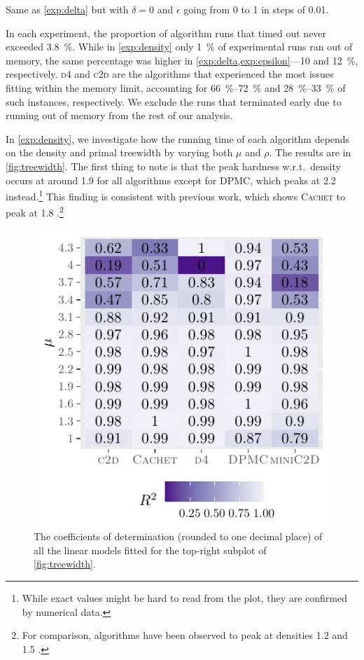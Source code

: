\begin{experiment}[$\epsilon$]\label{exp:epsilon}
  Same as \cref{exp:delta} but with $\delta = 0$ and $\epsilon$ going from 0 to
  1 in steps of 0.01.
\end{experiment}

In each experiment, the proportion of algorithm runs that timed out never
exceeded \SI{3.8}{\percent}. While in \cref{exp:density} only \SI{1}{\percent}
of experimental runs ran out of memory, the same percentage was higher in
\cref{exp:delta,exp:epsilon}---10 and \SI{12}{\percent}, respectively.
\textsc{d4} \citep{DBLP:conf/ijcai/LagniezM17} and
\textsc{c2d} are the algorithms that
experienced the most issues fitting within the memory limit, accounting for
\SIrange{66}{72}{\percent} and \SIrange{28}{33}{\percent} of such instances,
respectively. We exclude the runs that terminated early due to running out of
memory from the rest of our analysis.

In \cref{exp:density}, we investigate how the running time of each algorithm
depends on the density and primal treewidth by varying both $\mu$ and $\rho$.
The results are in \cref{fig:treewidth}. The first thing to note is that the
peak hardness w.r.t.\ density occurs at around 1.9 for all algorithms except for
\textsc{DPMC}, which peaks at 2.2 instead.\footnote{While exact values might be
  hard to read from the plot, they are confirmed by numerical data.} This
finding is consistent with previous work, which shows \textsc{Cachet} to peak at
1.8 \citep{DBLP:conf/sat/SangBBKP04}.\footnote{For comparison, \mc{} algorithms
  have been observed to peak at densities 1.2 and 1.5
  \citep{DBLP:conf/aaai/Pehoushek00}.}

\begin{figure}[t]
  \centering
  \includegraphics{chapters/comparison/r2}
  \caption{The coefficients of determination (rounded to one decimal place) of
    all the linear models fitted for the top-right subplot of
    \cref{fig:treewidth}.}\label{fig:r2}
\end{figure}

